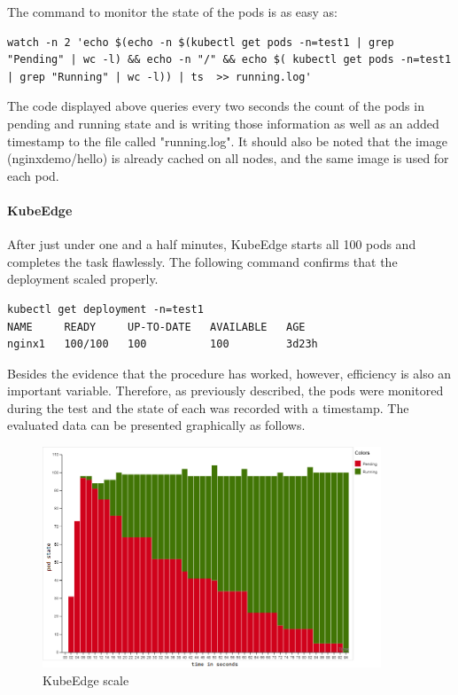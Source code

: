 \documentclass[MIC,Master,english]{twbook}%
\begin{document}
The command to monitor the state of the pods is as easy as:

\vspace{\baselineskip}
\begin{minipage}{\linewidth}
\begin{lstlisting}[caption={Pods status},captionpos=b]
watch -n 2 'echo $(echo -n $(kubectl get pods -n=test1 | grep "Pending" | wc -l) && echo -n "/" && echo $( kubectl get pods -n=test1 | grep "Running" | wc -l)) | ts  >> running.log'
\end{lstlisting}
\end{minipage}
\vspace{\baselineskip}

The code displayed above queries every two seconds the count of the pods in pending and running state and is writing those information as well as an added timestamp to the file called "running.log". It should also be noted that the image (nginxdemo/hello) is already cached on all nodes, and the same image is used for each pod.

\paragraph{KubeEdge} After just under one and a half minutes, KubeEdge starts all 100 pods and completes the task flawlessly. The following command confirms that the deployment scaled properly.
\vspace{\baselineskip}

\begin{lstlisting}[caption={KubeEdge scaling proof},captionpos=b]
kubectl get deployment -n=test1
NAME     READY     UP-TO-DATE   AVAILABLE   AGE
nginx1   100/100   100          100         3d23h
\end{lstlisting}

Besides the evidence that the procedure has worked, however, efficiency is also an important variable. Therefore, as previously described, the pods were monitored during the test and the state of each was recorded with a timestamp. The evaluated data can be presented graphically as follows.

\begin{center}
\begin{figure}[ht]
    \centering
    \includegraphics[width=0.9\textwidth]{PICs/kubeedge-scale-100.png}
    \caption{KubeEdge scale}
    \label{fig:kubeedge-scale}
\end{figure}
\end{center}
\end{document}
